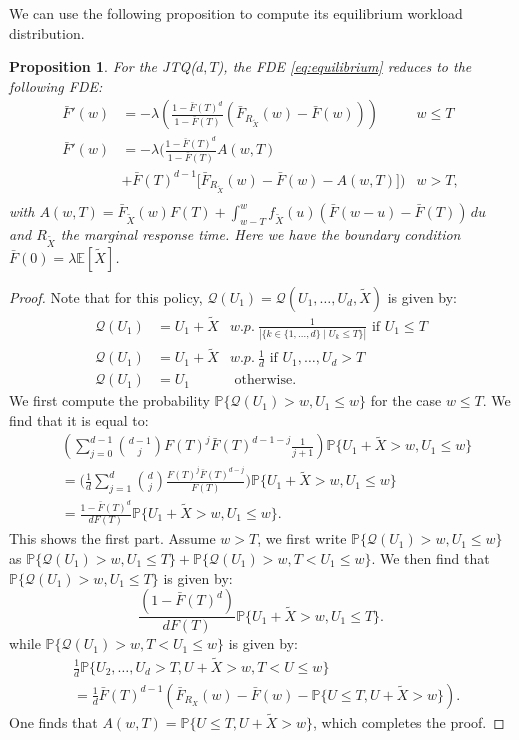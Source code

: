 \documentclass[12pt]{report}
\renewcommand{\P}{\mathbb{P}}
\newcommand{\E}{\mathbb{E}}
\newcommand{\QQ}{\mathcal{Q}}
\renewcommand{\P}{\mathbb{P}}
\newtheorem{proposition}[theorem]{Proposition}
\begin{document}
We can use the following proposition to compute its equilibrium workload distribution.
\begin{proposition}\label{prop:JTQ}
For the JTQ($d,T$), the FDE \eqref{eq:equilibrium} reduces to the following FDE:
\begin{align*}
\bar F'(w) &= -\lambda \left( \frac{1-\bar F(T)^d}{1-\bar F(T)} (\bar F_{R_{\tilde X}}(w)-\bar F(w)) \right) & w \leq T\\
\bar F'(w) &= - \lambda \bigg( \frac{1-\bar F(T)^d}{1-\bar F(T)} A(w,T)\\
& + \bar F(T)^{d-1}\bigg[ \bar F_{R_{\tilde X}}(w) - \bar F(w) - A(w,T) \bigg] \bigg) & w >T,\\
\end{align*}
with $A(w,T) = \bar F_{\tilde X}(w) F(T) + \int_{w-T}^w f_{\tilde{X}}(u) (\bar F(w-u) - \bar F(T))\, du$ and $R_{\tilde X}$ the marginal response time. Here we have the boundary condition $\bar F(0) = \lambda \E[\tilde{X}]$.
\end{proposition}
\begin{proof}

Note that for this policy, $\QQ(U_1)=\QQ(U_1,\dots,U_d,\tilde X)$ is given by:
\begin{align*}
\QQ(U_1) &= U_1 + \tilde X & w.p.~\frac{1}{|\{k \in \{1,\dots,d\} \mid U_k\leq T\}|} \mbox{ if } U_1\leq T\\
\QQ(U_1) &= U_1 + \tilde X & w.p.~\frac{1}{d} \mbox{ if } U_1,\dots, U_d > T\\
\QQ(U_1) &= U_1 & \mbox{ otherwise. }
\end{align*}
We first compute the probability $\P\{\QQ(U_1) > w, U_1 \leq w\}$ for the case $w\leq T$. We find that it is equal to:
\begin{align*}
&\left(
\sum_{j=0}^{d-1} \binom{d-1}{j} F(T)^j \bar F(T)^{d-1-j} \frac{1}{j+1}
\right) \P\{U_1+\tilde X > w, U_1 \leq w\}\\
&=\bigg(\frac{1}{d} \sum_{j=1}^d \binom{d}{j} \frac{F(T)^j \bar F(T)^{d-j}}{F(T)} \bigg) \P\{U_1+\tilde X > w, U_1 \leq w\}\\
& = \frac{1-\bar F(T)^d}{d F(T)} \P\{U_1+\tilde X > w, U_1 \leq w\}. 
\end{align*}
This shows the first part. Assume $w > T$, we first write $\P\{\QQ(U_1) > w, U_1 \leq w\}$ as $\P\{\QQ(U_1) > w, U_1 \leq T\} + \P\{\QQ(U_1) > w, T<U_1 \leq w\}$. We then find that $\P\{\QQ(U_1) > w, U_1 \leq T\}$ is given by:
$$
\frac{(1-\bar F(T)^d)}{d F(T)} \P\{U_1+\tilde X > w, U_1 \leq T\}.
$$
while $\P\{\QQ(U_1)>w, T<U_1 \leq w\}$ is given by:
\begin{align*}
&\frac{1}{d} \P\{ U_2,\dots, U_d > T, U+\tilde{X} > w, T<U\leq w\}\\
&=\frac{1}{d} \bar F(T)^{d-1} (\bar F_{R_X}(w) - \bar F(w) - \P\{U\leq T, U+\tilde X > w\}).
\end{align*}
One finds that $A(w,T) = \P\{U\leq T, U+\tilde X > w\}$, which completes the proof.
\end{proof}
\end{document}
